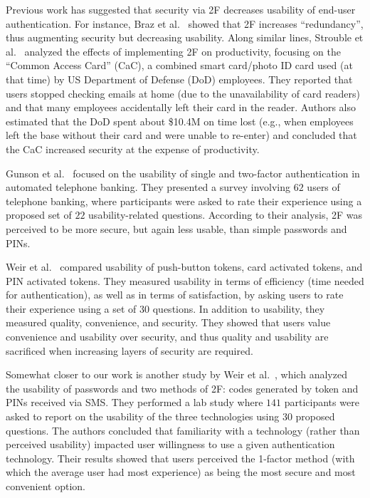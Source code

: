 \documentclass[conference]{IEEEtran}
\begin{document}
Previous work has suggested that security via 2F decreases usability of end-user authentication. For instance, Braz et al.~\cite{braz2006security} showed that 2F increases ``redundancy'', thus augmenting security but decreasing usability. Along similar lines, Strouble et al.~\cite{strouble2009productivity} analyzed the effects of implementing 2F on productivity, focusing on the ``Common Access Card'' (CaC), a combined smart card/photo ID card used (at that time) by US Department of Defense (DoD) employees. They reported that users stopped checking emails at home (due to the unavailability of card readers) and that many employees accidentally left their card in the reader. Authors also estimated that the DoD spent about \$10.4M on time lost (e.g., when employees left the base without their card and were unable to re-enter) and concluded that the CaC increased security at the expense of productivity.
 
Gunson et al.~\cite{gunson2011user} focused on the usability of single and two-factor authentication in automated telephone banking. They presented a survey involving $62$ users of telephone banking, where participants were asked to rate their experience using a proposed set of $22$ usability-related questions. According to their analysis, 2F was perceived to be more secure, but again less usable, than simple passwords and PINs.

Weir et al.~\cite{weir2009user} compared usability of push-button tokens, card activated tokens, and PIN activated tokens. They measured usability in terms of efficiency (time needed for authentication), 
as well as in terms of satisfaction, by asking users to rate their experience using a  set of $30$ questions. In addition to usability, 
they measured quality, convenience, and security. They showed that users value convenience and usability over security, and thus quality and usability are sacrificed when increasing layers of security are required. 


Somewhat closer to our work is another study by Weir et al.~\cite{weir2010usable}, which analyzed the usability of passwords and two methods of 2F: codes generated by token and PINs received via SMS. They performed a lab study where $141$ participants were asked to report on the usability of the three technologies using $30$ proposed questions. The authors concluded that familiarity with a technology (rather than perceived usability) impacted user willingness to use a given authentication technology. Their results showed that users perceived the 1-factor method (with which the average user had most experience) as being the most secure and most convenient option. 
\end{document}
